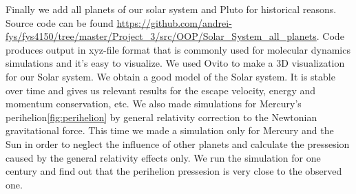 \documentclass[10pt]{article}
\begin{document}
Finally we add all planets of our solar system and Pluto for historical reasons. Source code can be found \url{https://github.com/andrei-fys/fys4150/tree/master/Project_3/src/OOP/Solar_System_all_planets}. Code produces output in xyz-file format that is commonly used for molecular dynamics simulations and it's easy to visualize. We used Ovito\cite{ovito} to make a 3D visualization for our Solar system. We obtain a good model of the Solar system. It is stable over time and gives us relevant results for the escape velocity, energy and momentum conservation, etc. We also made simulations for Mercury's perihelion\ref{fig:perihelion} by general relativity correction to the Newtonian gravitational force. This time we made a simulation only for Mercury and the Sun in order to neglect the influence of other planets and calculate the pressesion caused by the general relativity effects only. We run the simulation for one century and find out that the perihelion pressesion is very close to the observed one.

\clearpage
\end{document}
